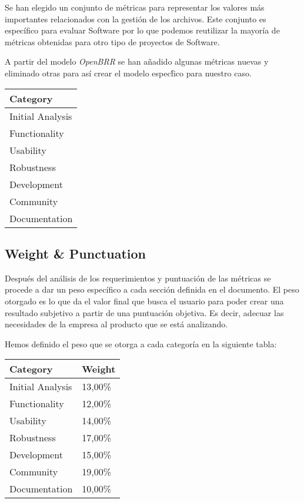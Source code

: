 \documentclass[11pt]{scrartcl}
\begin{document}
\par Se han elegido un conjunto de m\'etricas para representar los valores m\'as importantes relacionados con la gesti\'on de los archivos. Este conjunto es espec\'ifico para evaluar Software por lo que podemos reutilizar la mayor\'ia de m\'etricas obtenidas para otro tipo de proyectos de Software.

\par A partir del modelo \emph{OpenBRR} se han a\~nadido algunas m\'etricas nuevas y eliminado otras para as\'i crear el modelo espec\'fico para nuestro caso.

\begin{tabular}{|l|}
    \hline {\bf Category}\\
    \hline Initial Analysis\\
    \hline Functionality\\
    \hline Usability\\
    \hline Robustness\\
    \hline Development\\
    \hline Community\\
    \hline Documentation\\
    \hline
\end{tabular}

\subsection{Weight \& Punctuation}

Despu\'es del an\'alisis de los requerimientos y puntuaci\'on de las m\'etricas se procede a dar un peso espec\'ifico a cada secci\'on definida en el documento. El peso otorgado es lo que da el valor final que busca el usuario para poder crear una resultado subjetivo a partir de una puntuaci\'on objetiva. Es decir, adecuar las necesidades de la empresa al producto que se est\'a analizando.

Hemos definido el peso que se otorga a cada categor\'ia en la siguiente tabla:

\begin{tabular}{|l|l|}
    \hline Category & Weight\\
    \hline Initial Analysis	 & 13,00\%\\
    \hline Functionality & 12,00\%\\
    \hline Usability & 14,00\%\\
    \hline Robustness & 17,00\%\\
    \hline Development & 15,00\%\\
    \hline Community & 19,00\%\\
    \hline Documentation & 10,00\%\\
    \hline
\end{tabular}
\end{document}
